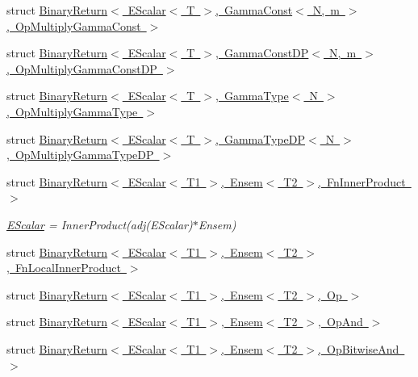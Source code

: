 \begin{DoxyCompactItemize}
\item 
struct \mbox{\hyperlink{structENSEM_1_1BinaryReturn_3_01EScalar_3_01T_01_4_00_01GammaConst_3_01N_00_01m_01_4_00_01OpMultiplyGammaConst_01_4}{Binary\+Return$<$ E\+Scalar$<$ T $>$, Gamma\+Const$<$ N, m $>$, Op\+Multiply\+Gamma\+Const $>$}}
\item 
struct \mbox{\hyperlink{structENSEM_1_1BinaryReturn_3_01EScalar_3_01T_01_4_00_01GammaConstDP_3_01N_00_01m_01_4_00_01OpMultiplyGammaConstDP_01_4}{Binary\+Return$<$ E\+Scalar$<$ T $>$, Gamma\+Const\+D\+P$<$ N, m $>$, Op\+Multiply\+Gamma\+Const\+D\+P $>$}}
\item 
struct \mbox{\hyperlink{structENSEM_1_1BinaryReturn_3_01EScalar_3_01T_01_4_00_01GammaType_3_01N_01_4_00_01OpMultiplyGammaType_01_4}{Binary\+Return$<$ E\+Scalar$<$ T $>$, Gamma\+Type$<$ N $>$, Op\+Multiply\+Gamma\+Type $>$}}
\item 
struct \mbox{\hyperlink{structENSEM_1_1BinaryReturn_3_01EScalar_3_01T_01_4_00_01GammaTypeDP_3_01N_01_4_00_01OpMultiplyGammaTypeDP_01_4}{Binary\+Return$<$ E\+Scalar$<$ T $>$, Gamma\+Type\+D\+P$<$ N $>$, Op\+Multiply\+Gamma\+Type\+D\+P $>$}}
\item 
struct \mbox{\hyperlink{structENSEM_1_1BinaryReturn_3_01EScalar_3_01T1_01_4_00_01Ensem_3_01T2_01_4_00_01FnInnerProduct_01_4}{Binary\+Return$<$ E\+Scalar$<$ T1 $>$, Ensem$<$ T2 $>$, Fn\+Inner\+Product $>$}}
\begin{DoxyCompactList}\small\item\em \mbox{\hyperlink{classENSEM_1_1EScalar}{E\+Scalar}} = Inner\+Product(adj(\+E\+Scalar)$\ast$\+Ensem) \end{DoxyCompactList}\item 
struct \mbox{\hyperlink{structENSEM_1_1BinaryReturn_3_01EScalar_3_01T1_01_4_00_01Ensem_3_01T2_01_4_00_01FnLocalInnerProduct_01_4}{Binary\+Return$<$ E\+Scalar$<$ T1 $>$, Ensem$<$ T2 $>$, Fn\+Local\+Inner\+Product $>$}}
\item 
struct \mbox{\hyperlink{structENSEM_1_1BinaryReturn_3_01EScalar_3_01T1_01_4_00_01Ensem_3_01T2_01_4_00_01Op_01_4}{Binary\+Return$<$ E\+Scalar$<$ T1 $>$, Ensem$<$ T2 $>$, Op $>$}}
\item 
struct \mbox{\hyperlink{structENSEM_1_1BinaryReturn_3_01EScalar_3_01T1_01_4_00_01Ensem_3_01T2_01_4_00_01OpAnd_01_4}{Binary\+Return$<$ E\+Scalar$<$ T1 $>$, Ensem$<$ T2 $>$, Op\+And $>$}}
\item 
struct \mbox{\hyperlink{structENSEM_1_1BinaryReturn_3_01EScalar_3_01T1_01_4_00_01Ensem_3_01T2_01_4_00_01OpBitwiseAnd_01_4}{Binary\+Return$<$ E\+Scalar$<$ T1 $>$, Ensem$<$ T2 $>$, Op\+Bitwise\+And $>$}}

\end{DoxyCompactItemize}
